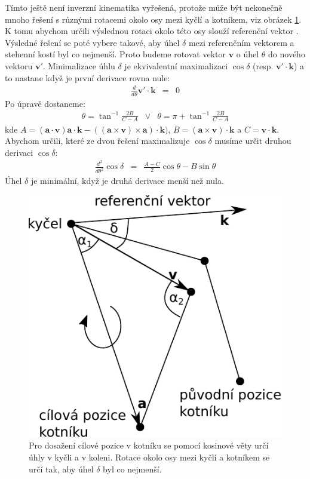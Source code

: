 Tímto ještě není inverzní kinematika vyřešená, protože může být nekonečně mnoho řešení s různými rotacemi okolo osy mezi kyčlí a kotníkem, viz obrázek \ref{fig:analytical_IK}. K tomu abychom určili výslednou rotaci okolo této osy slouží referenční vektor \cite{analytic_IK}. Výsledné řešení se poté vybere takové, aby úhel $\delta$ mezi referenčním vektorem a stehenní kostí byl co nejmenší. Proto budeme rotovat vektor $\mathbf{v}$ o úhel $\theta$ do nového vektoru $\mathbf{v}'$. Minimalizace úhlu $\delta$ je ekvivalentní maximalizaci $\cos\delta$ (resp. $\mathbf{v}'\cdot \mathbf{k}$) a to nastane když je první derivace rovna nule:
\begin{eqnarray}
\frac{d}{d\theta}\mathbf{v}'\cdot \mathbf{k} &=& 0
\label{r.IK_derivation}
\end{eqnarray}
Po úpravě dostaneme:
\begin{eqnarray}
\theta = \tan^{-1}\frac{2 B}{C-A} &\vee & \theta = \pi + \tan^{-1}\frac{2 B}{C-A}
\label{r.IK_derivation2}
\end{eqnarray}
kde $A = (\mathbf{a}\cdot \mathbf{v})\mathbf{a} \cdot \mathbf{k} - ((\mathbf{a} \times \mathbf{v})\times \mathbf{a})\cdot \mathbf{k})$, $B = (\mathbf{a} \times \mathbf{v})\cdot \mathbf{k}$ a $C = \mathbf{v}\cdot \mathbf{k}$. Abychom určili, které ze dvou řešení maximalizuje $\cos\delta$ musíme určit druhou derivaci $\cos\delta$:
\begin{eqnarray}
\frac{d^2}{d\theta^2}\cos\delta &=& \frac{A-C}{2} \cos\theta - B\sin\theta
\label{r.IK_derivation3}
\end{eqnarray}
Úhel $\delta$ je minimální, když je druhá derivace menší než nula.

\begin{figure}[h]
	\centering
	\includegraphics[width=0.4\linewidth]{fig/analytical_IK.pdf}
	\caption{Pro dosažení cílové pozice v kotníku se pomocí kosinové věty určí úhly v kyčli a v koleni. Rotace okolo osy mezi kyčlí a kotníkem se určí tak, aby úhel  $\delta$ byl co nejmenší.}
	\label{fig:analytical_IK}
\end{figure}


